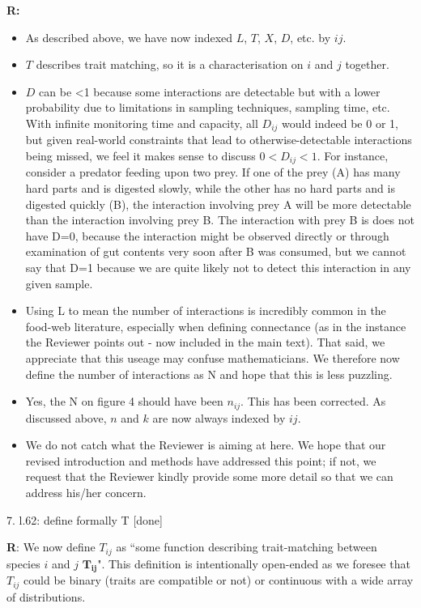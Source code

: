 \documentclass[12pt]{letter}
\begin{document}
		\textbf{R:} 
			\begin{itemize}
				\item As described above, we have now indexed $L$, $T$, $X$, $D$, etc. by $ij$. 
				\item $T$ describes trait matching, so it is a characterisation on $i$ and $j$ together. 
				\item $D$ can be \textless1 because some interactions are detectable but with a lower probability due to limitations in sampling techniques, sampling time, etc. With infinite monitoring time and capacity, all $D_{ij}$ would indeed be 0 or 1, but given real-world constraints that lead to otherwise-detectable interactions being missed, we feel it makes sense to discuss $0<D_{ij}<1$. For instance, consider a predator feeding upon two prey. If one of the prey (A) has many hard parts and is digested slowly, while the other has no hard parts and is digested quickly (B), the interaction involving prey A will be more detectable than the interaction involving prey B. The interaction with prey B is does not have D=0, because the interaction might be observed directly or through examination of gut contents very soon after B was consumed, but we cannot say that D=1 because we are quite likely not to detect this interaction in any given sample.
				\item Using L to mean the number of interactions is incredibly common in the food-web literature, especially when defining connectance (as in the instance the Reviewer points out - now included in the main text). That said, we appreciate that this useage may confuse mathematicians. We therefore now define the number of interactions as N and hope that this is less puzzling.
				\item Yes, the N on figure 4 should have been $n_{ij}$. This has been corrected. As discussed above, $n$ and $k$ are now always indexed by $ij$. 
				\item We do not catch what the Reviewer is aiming at here. We hope that our revised introduction and methods have addressed this point; if not, we request that the Reviewer kindly provide some more detail so that we can address his/her concern.
			\end{itemize}


	7. l.62: define formally T [done]


		\textbf{R}: We now define $T_{ij}$ as ``some function describing trait-matching between species $i$ and $j$ $\mathbf{T_{ij}}$". This definition is intentionally open-ended as we foresee that $T_{ij}$ could be binary (traits are compatible or not) or continuous with a wide array of distributions.
\end{document}
